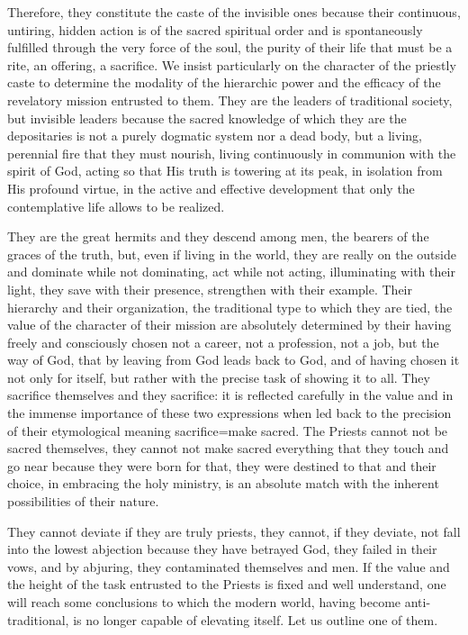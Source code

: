 Therefore, they constitute the caste of the invisible ones because their continuous, untiring, hidden action is of the sacred spiritual order and is spontaneously fulfilled through the very force of the soul, the purity of their life that must be a rite, an offering, a sacrifice. We insist particularly on the character of the priestly caste to determine the modality of the hierarchic power and the efficacy of the revelatory mission entrusted to them. They are the leaders of traditional society, but invisible leaders because the sacred knowledge of which they are the depositaries is not a purely dogmatic system nor a dead body, but a living, perennial fire that they must nourish, living continuously in communion with the spirit of God, acting so that His truth is towering at its peak, in isolation from His profound virtue, in the active and effective development that only the contemplative life allows to be realized.

They are the great hermits and they descend among men, the bearers of the graces of the truth, but, even if living in the world, they are really on the outside and dominate while not dominating, act while not acting, illuminating with their light, they save with their presence, strengthen with their example. Their hierarchy and their organization, the traditional type to which they are tied, the value of the character of their mission are absolutely determined by their having freely and consciously chosen not a career, not a profession, not a job, but the way of God, that by leaving from God leads back to God, and of having chosen it not only for itself, but rather with the precise task of showing it to all. They sacrifice themselves and they sacrifice: it is reflected carefully in the value and in the immense importance of these two expressions when led back to the precision of their etymological meaning sacrifice=make sacred. The Priests cannot not be sacred themselves, they cannot not make sacred everything that they touch and go near because they were born for that, they were destined to that and their choice, in embracing the holy ministry, is an absolute match with the inherent possibilities of their nature.

They cannot deviate if they are truly priests, they cannot, if they deviate, not fall into the lowest abjection because they have betrayed God, they failed in their vows, and by abjuring, they contaminated themselves and men. If the value and the height of the task entrusted to the Priests is fixed and well understand, one will reach some conclusions to which the modern world, having become anti-traditional, is no longer capable of elevating itself. Let us outline one of them.

